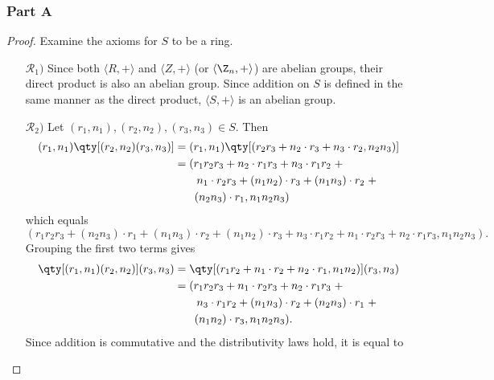 \documentclass[12pt,titlepage]{extarticle}
\begin{document}
\subsubsection*{Part A}
\begin{proof}
    Examine the axioms for $S$ to be a ring.
    \begin{enumerate}
        \item[$\mathcal{R}_1 )$]
            Since both $\langle R, + \rangle$ and $\langle Z, + \rangle$ (or $\langle \Z_n, + \rangle$) are abelian groups, their direct product is also an abelian group. Since addition on $S$ is defined in the same manner as the direct product, $\langle S, + \rangle$ is an abelian group.
        \item[$\mathcal{R}_2 )$]
            Let $(r_1,n_1), (r_2,n_2), (r_3,n_3) \in S$. Then
            \begin{align*}
                (r_1, n_1) \qty[(r_2, n_2)(r_3, n_3)] &= (r_1, n_1) \qty[(r_2 r_3 + n_2 \cdot r_3 + n_3 \cdot r_2, n_2 n_3)] \\
                &= (r_1 r_2 r_3 + n_2 \cdot r_1 r_3 + n_3 \cdot r_1 r_2 \;+ \\
                &\hspace{0.7cm}n_1 \cdot r_2 r_3 + (n_1 n_2) \cdot r_3 + (n_1 n_3) \cdot r_2 \;+\\
                &\hspace{0.63cm}(n_2 n_3) \cdot r_1, n_1 n_2 n_3)
            \end{align*}
            which equals
            \[
                (r_1r_2r_3 + (n_2 n_3) \cdot r_1 + (n_1 n_3) \cdot r_2 + (n_1 n_2) \cdot r_3 + n_3 \cdot r_1 r_2 + n_1 \cdot r_2 r_3 + n_2 \cdot r_1 r_3, n_1 n_2 n_3)
            .\]
            Grouping the first two terms gives
            \begin{align*}
                \qty[(r_1, n_1) (r_2, n_2)](r_3, n_3) &= \qty[(r_1 r_2 + n_1 \cdot r_2 + n_2 \cdot r_1, n_1 n_2)] (r_3, n_3) \\
                &= (r_1 r_2 r_3 + n_1 \cdot r_2 r_3 + n_2 \cdot r_1 r_3 \;+ \\
                &\hspace{0.7cm} n_3 \cdot r_1 r_2 + (n_1 n_3) \cdot r_2 + (n_2 n_3) \cdot r_1 \;+\\
                &\hspace{0.63cm}(n_1 n_2) \cdot r_3, n_1 n_2 n_3).
            \end{align*}
            Since addition is commutative and the distributivity laws hold, it is equal to

\end{enumerate}
\end{proof}
\end{document}
